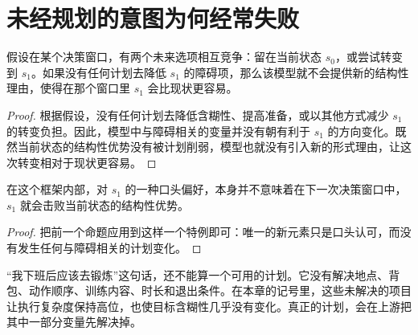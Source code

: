 \section{未经规划的意图为何经常失败}

\begin{proposition}[未经规划的意图保留了当前优势]
假设在某个决策窗口，有两个未来选项相互竞争：留在当前状态 $s_0$，或尝试转变到 $s_1$。如果没有任何计划去降低 $s_1$ 的障碍项，那么该模型就不会提供新的结构性理由，使得在那个窗口里 $s_1$ 会比现状更容易。
\end{proposition}

\begin{proof}
根据假设，没有任何计划去降低含糊性、提高准备，或以其他方式减少 $s_1$ 的转变负担。因此，模型中与障碍相关的变量并没有朝有利于 $s_1$ 的方向变化。既然当前状态的结构性优势没有被计划削弱，模型也就没有引入新的形式理由，让这次转变相对于现状更容易。
\end{proof}

\begin{corollary}[未经规划的偏好本身并不会逆转惯性]
在这个框架内部，对 $s_1$ 的一种口头偏好，本身并不意味着在下一次决策窗口中，$s_1$ 就会击败当前状态的结构性优势。
\end{corollary}

\begin{proof}
把前一个命题应用到这样一个特例即可：唯一的新元素只是口头认可，而没有发生任何与障碍相关的计划变化。
\end{proof}

\begin{example}[下班后锻炼]
“我下班后应该去锻炼”这句话，还不能算一个可用的计划。它没有解决地点、背包、动作顺序、训练内容、时长和退出条件。在本章的记号里，这些未解决的项目让执行复杂度保持高位，也使目标含糊性几乎没有变化。真正的计划，会在上游把其中一部分变量先解决掉。
\end{example}